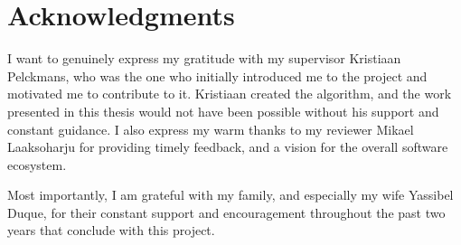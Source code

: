 \chapter{Acknowledgments} \label{ch:acknowledgments}

I want to genuinely express my gratitude with my supervisor Kristiaan Pelckmans, who was the one who initially introduced me to the \vasco project and motivated me to contribute to it. Kristiaan created the \mlblink algorithm, and the work presented in this thesis would not have been possible without his support and constant guidance. I also express my warm thanks to my reviewer Mikael Laaksoharju for providing timely feedback, and a vision for the overall \mlblink software ecosystem. \newline

Most importantly, I am grateful with my family, and especially my wife Yassibel Duque, for their constant support and encouragement throughout the past two years that conclude with this project.